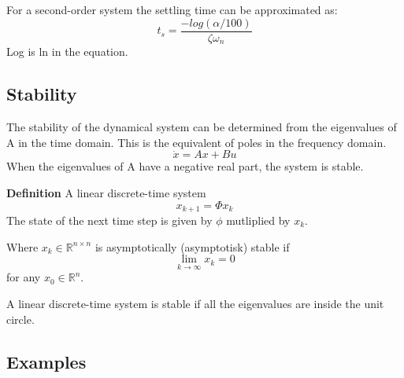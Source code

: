 For a second-order system the settling time can be approximated as:
$$t_s = \frac{-log(\alpha/100)}{\zeta \omega_n}$$
Log is ln in the equation.


\subsection{Stability}
The stability of the dynamical system can be determined from the eigenvalues of A in the time domain.
This is the equivalent of poles in the frequency domain.
$$\dot{x} = Ax+Bu$$
When the eigenvalues of A have a negative real part, the system is stable.

\textbf{Definition}
A linear discrete-time system
$$x_{k+1}=\Phi x_k$$
The state of the next time step is given by $\phi$ mutliplied by $x_k$.

Where $x_k \in \mathbb{R}^{n \times n}$ is asymptotically (asymptotisk) stable if
$$\lim_{k \to \infty} x_k = 0$$
for any $x_0 \in \mathbb{R}^n$.

A linear discrete-time system is stable if all the eigenvalues are inside the unit circle.




\subsection{Examples}
